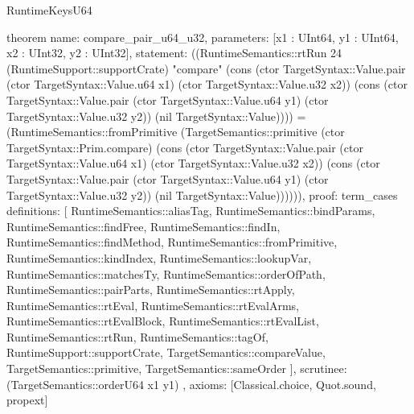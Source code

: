 \begin{lexlean}{RuntimeKeysU64}
\begin{semanticmodule}
theorem{
  name: compare_pair_u64_u32,
  parameters: [x1 : UInt64, y1 : UInt64, x2 : UInt32, y2 : UInt32],
  statement: ((RuntimeSemantics::rtRun 24 (RuntimeSupport::supportCrate) "compare" (cons (ctor TargetSyntax::Value.pair (ctor TargetSyntax::Value.u64 x1) (ctor TargetSyntax::Value.u32 x2)) (cons (ctor TargetSyntax::Value.pair (ctor TargetSyntax::Value.u64 y1) (ctor TargetSyntax::Value.u32 y2)) (nil TargetSyntax::Value)))) = (RuntimeSemantics::fromPrimitive (TargetSemantics::primitive (ctor TargetSyntax::Prim.compare) (cons (ctor TargetSyntax::Value.pair (ctor TargetSyntax::Value.u64 x1) (ctor TargetSyntax::Value.u32 x2)) (cons (ctor TargetSyntax::Value.pair (ctor TargetSyntax::Value.u64 y1) (ctor TargetSyntax::Value.u32 y2)) (nil TargetSyntax::Value)))))),
  proof: term_cases{
    definitions: [
      RuntimeSemantics::aliasTag,
      RuntimeSemantics::bindParams,
      RuntimeSemantics::findFree,
      RuntimeSemantics::findIn,
      RuntimeSemantics::findMethod,
      RuntimeSemantics::fromPrimitive,
      RuntimeSemantics::kindIndex,
      RuntimeSemantics::lookupVar,
      RuntimeSemantics::matchesTy,
      RuntimeSemantics::orderOfPath,
      RuntimeSemantics::pairParts,
      RuntimeSemantics::rtApply,
      RuntimeSemantics::rtEval,
      RuntimeSemantics::rtEvalArms,
      RuntimeSemantics::rtEvalBlock,
      RuntimeSemantics::rtEvalList,
      RuntimeSemantics::rtRun,
      RuntimeSemantics::tagOf,
      RuntimeSupport::supportCrate,
      TargetSemantics::compareValue,
      TargetSemantics::primitive,
      TargetSemantics::sameOrder
    ],
    scrutinee: (TargetSemantics::orderU64 x1 y1)
  },
  axioms: [Classical.choice, Quot.sound, propext]
}


\end{semanticmodule}
\end{lexlean}
